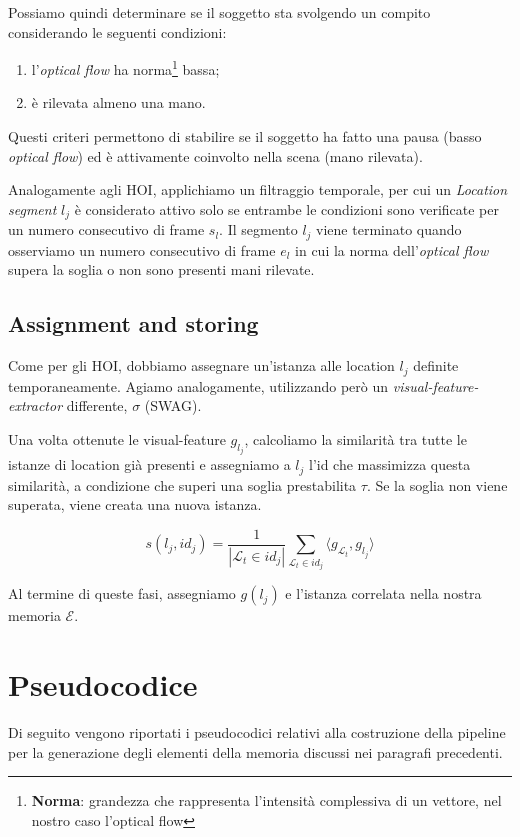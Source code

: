 Possiamo quindi determinare se il soggetto sta svolgendo un compito considerando le seguenti condizioni:
\begin{enumerate}
    \item l'\emph{optical flow} ha norma\footnote{\textbf{Norma}: grandezza che rappresenta l'intensità complessiva di un vettore, nel nostro caso l'optical flow} bassa;
    \item è rilevata almeno una mano.
\end{enumerate}
Questi criteri permettono di stabilire se il soggetto ha fatto una pausa (basso \emph{optical flow}) ed è attivamente coinvolto nella scena (mano rilevata).

Analogamente agli HOI, applichiamo un filtraggio temporale, per cui un \emph{Location segment} $l_j$ è considerato attivo solo se entrambe le condizioni sono verificate per un numero consecutivo di frame $s_l$. Il segmento $l_j$ viene terminato quando osserviamo un numero consecutivo di frame $e_l$ in cui la norma dell'\emph{optical flow} supera la soglia o non sono presenti mani rilevate.

\subsection*{Assignment and storing}
Come per gli HOI, dobbiamo assegnare un'istanza alle location $l_j$ definite temporaneamente. Agiamo analogamente, utilizzando però un \emph{visual-feature-extractor} differente, $\sigma$ (SWAG)\cite{singh2022revisitingweaklysupervisedpretraining}.

Una volta ottenute le visual-feature $g_{l_j}$, calcoliamo la similarità tra tutte le istanze di location già presenti e assegniamo a $l_j$ l'id che massimizza questa similarità, a condizione che superi una soglia prestabilita $\tau$. Se la soglia non viene superata, viene creata una nuova istanza.

\[
s(l_j, id_j) = \frac{1}{|\mathcal{L}_t \in id_j|} \sum_{\mathcal{L}_t \in id_j} \langle g_{\mathcal{L}_t}, g_{l_j} \rangle
\]

Al termine di queste fasi, assegniamo $g(l_j)$ e l'istanza correlata nella nostra memoria $\mathcal{E}$.

\section{Pseudocodice}

Di seguito vengono riportati i pseudocodici relativi alla costruzione della pipeline per la generazione degli elementi della memoria discussi nei paragrafi precedenti.
